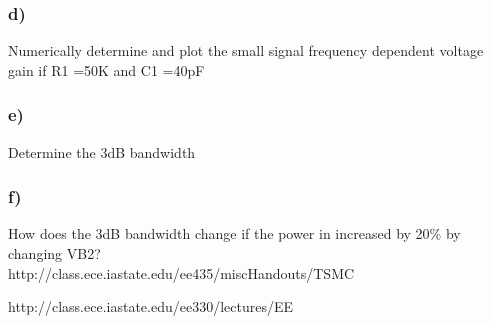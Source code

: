\documentclass[10pt,a4paper]{article}
\begin{document}
\subsubsection*{d)}Numerically determine and plot the small signal frequency dependent voltage gain if R1 =50K and C1 =40pF\\

\subsubsection*{e)}Determine the 3dB bandwidth\\

\subsubsection*{f)}How does the 3dB bandwidth change if the power in increased by 20\% by changing VB2?\\


http://class.ece.iastate.edu/ee435/miscHandouts/TSMC%

http://class.ece.iastate.edu/ee330/lectures/EE%
\end{document}
